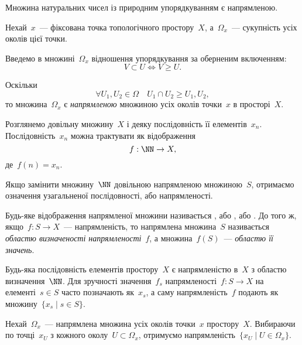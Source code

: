 \begin{example}
    Множина натуральних чисел із природним упорядкуванням є напрямленою.
\end{example}

\begin{example}
    Нехай~$x$~--- фіксована точка топологічного простору~$X$, а~$\Omega_x$~--- сукупність усіх околів цієї точки. 

    Введемо в множині~$\Omega_x$ відношення упорядкування за оберненим включенням:
    \begin{equation*}
        V \subset U \iff V \ge U.
    \end{equation*}

    Оскільки
    \begin{equation*}
        \forall U_1, U_2 \in \Omega \quad U_1 \cap U_2 \ge U_1, U_2, 
    \end{equation*}
    то множина~$\Omega_x$ є \emph{напрямленою} множиною усіх околів точки~$x$ в просторі~$X$.
\end{example}

Розглянемо довільну множину~$X$ і деяку послідовність її елементів~$x_n$. Послідовність~$x_n$ можна трактувати як відображення
\begin{equation*}
    f: \NN \to X,
\end{equation*}
де~$f(n) = x_n$. 

Якщо замінити множину~$\NN$ довільною напрямленою множиною~$S$, отримаємо означення узагальненої послідовності, або напрямленості.

\begin{definition}
    Будь-яке відображення напрямленої множини називається , або , або . До того ж, якщо~$f: S \to X$~--- напрямленість, то напрямлена множина~$S$ називається \emph{областю визначеності напрямленості}~$f$, а множина~$f(S)$~--- \emph{областю її значень}.
\end{definition}

\begin{remark}
    Будь-яка послідовність елементів простору~$X$ є напрямленістю в~$X$ з областю визначення~$\NN$. Для зручності значення~$f_s$ напрямленості~$f: S \to X$ на елементі~$s \in S$ часто позначають як~$x_s$, а саму напрямленість~$f$ подають як множину~$\{x_s \mid s \in S\}$.
\end{remark}

\begin{example}
    Нехай~$\Omega_x$~--- напрямлена множина усіх околів точки~$x$ простору~$X$. Вибираючи по точці~$x_U$ з кожного околу~$U \subset \Omega_x$, отримуємо напрямленість~$\{x_U \mid U \in \Omega_x\}$.
\end{example}

